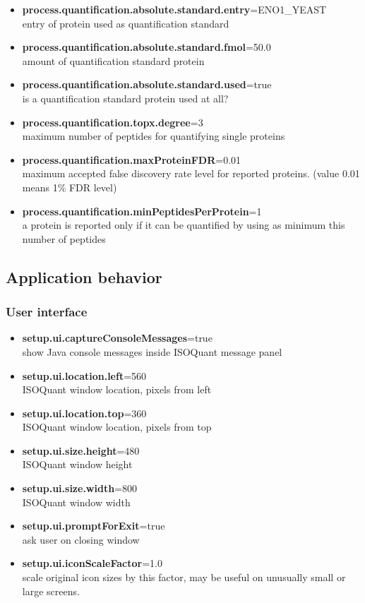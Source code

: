 \documentclass[]{article}
\providecommand{\tightlist}{%
  \setlength{\itemsep}{0pt}\setlength{\parskip}{0pt}}
\begin{document}
\begin{itemize}
\tightlist
\item
  \textbf{process.quantification.absolute.standard.entry}=ENO1\_YEAST\\
  entry of protein used as quantification standard
\item
  \textbf{process.quantification.absolute.standard.fmol}=50.0\\
  amount of quantification standard protein
\item
  \textbf{process.quantification.absolute.standard.used}=true\\
  is a quantification standard protein used at all?
\item
  \textbf{process.quantification.topx.degree}=3\\
  maximum number of peptides for quantifying single proteins
\item
  \textbf{process.quantification.maxProteinFDR}=0.01\\
  maximum accepted false discovery rate level for reported proteins.
  (value 0.01 means 1\% FDR level)
\item
  \textbf{process.quantification.minPeptidesPerProtein}=1\\
  a protein is reported only if it can be quantified by using as minimum
  this number of peptides
\end{itemize}

\subsection{Application behavior}\label{application-behavior}

\subsubsection{User interface}\label{user-interface}

\begin{itemize}
\tightlist
\item
  \textbf{setup.ui.captureConsoleMessages}=true\\
  show Java console messages inside ISOQuant message panel
\item
  \textbf{setup.ui.location.left}=560\\
  ISOQuant window location, pixels from left
\item
  \textbf{setup.ui.location.top}=360\\
  ISOQuant window location, pixels from top
\item
  \textbf{setup.ui.size.height}=480\\
  ISOQuant window height
\item
  \textbf{setup.ui.size.width}=800\\
  ISOQuant window width
\item
  \textbf{setup.ui.promptForExit}=true\\
  ask user on closing window
\item
  \textbf{setup.ui.iconScaleFactor}=1.0\\
  scale original icon sizes by this factor, may be useful on unusually
  small or large screens.
\end{itemize}
\end{document}
